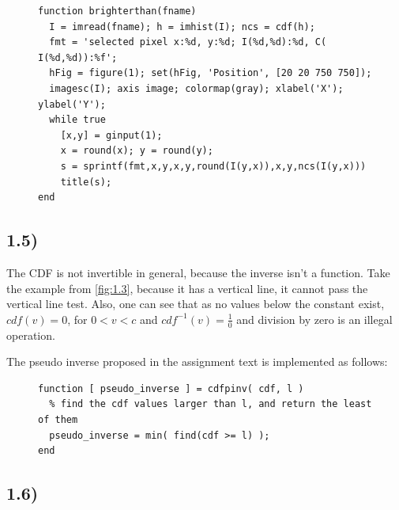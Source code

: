 \documentclass[a4paper]{article}
\begin{document}
\vfill
\begin{figure}[h!]
  \begin{lstlisting}[caption='Code to display Cumulative Histogram']
function brighterthan(fname)
  I = imread(fname); h = imhist(I); ncs = cdf(h);
  fmt = 'selected pixel x:%d, y:%d; I(%d,%d):%d, C( I(%d,%d)):%f';
  hFig = figure(1); set(hFig, 'Position', [20 20 750 750]);
  imagesc(I); axis image; colormap(gray); xlabel('X'); ylabel('Y');
  while true
    [x,y] = ginput(1);
    x = round(x); y = round(y);
    s = sprintf(fmt,x,y,x,y,round(I(y,x)),x,y,ncs(I(y,x)))
    title(s);
end\end{lstlisting}
\end{figure}

\newpage
\subsection*{1.5)}

The CDF is not invertible in general, because the inverse isn't a function. Take the example from \autoref{fig:1.3}, because it has a vertical line, it cannot pass the vertical line test. Also, one can see that as no values below the constant exist, $cdf(v)=0$, for $0<v<c$ and $cdf^{-1}(v) = \frac{1}{0}$ and division by zero is an illegal operation.

The pseudo inverse proposed in the assignment text is implemented as follows:
\begin{figure}[h!]
  \begin{lstlisting}[caption='cdf pseudo-inverse implementation']
function [ pseudo_inverse ] = cdfpinv( cdf, l )
  % find the cdf values larger than l, and return the least of them
  pseudo_inverse = min( find(cdf >= l) );
end\end{lstlisting}
\end{figure}

\subsection*{1.6)}
\end{document}
